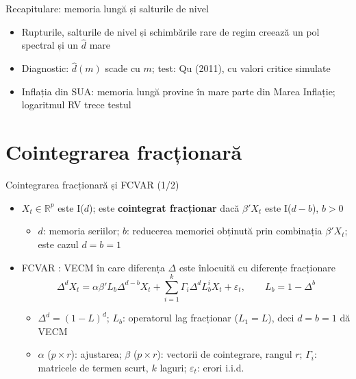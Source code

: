 \begin{frame}{Recapitulare: memoria lungă și salturile de nivel}
\itemsize{\small}
\begin{itemize}
    \item Rupturile, salturile de nivel și schimbările rare de regim creează un pol spectral și un $\hat d$ mare
    \item Diagnostic: $\hat d(m)$ scade cu $m$; test: Qu (2011), cu valori critice simulate
    \item Inflația din SUA: memoria lungă provine în mare parte din Marea Inflație; logaritmul RV trece testul
\end{itemize}
\end{frame}


\section{Cointegrarea fracționară}

\begin{frame}{Cointegrarea fracționară și FCVAR (1/2)}
\itemsize{\small}
\begin{itemize}
    \item $X_t \in \mathbb R^p$ este I($d$); este \textbf{cointegrat fracționar} dacă $\beta'X_t$ este I($d - b$), $b > 0$
    \begin{itemize}
        \item $d$: memoria seriilor; $b$: reducerea memoriei obținută prin combinația $\beta'X_t$;  este cazul $d = b = 1$
    \end{itemize}
    \item FCVAR : VECM în care diferența $\Delta$ este înlocuită cu diferențe fracționare
    \[ \Delta^dX_t = \alpha\beta'L_b\Delta^{d-b}X_t + \sum_{i=1}^k\Gamma_i\Delta^dL_b^iX_t + \varepsilon_t, \qquad L_b = 1 - \Delta^b \]
    \begin{itemize}
        \item $\Delta^d = (1 - L)^d$; $L_b$: operatorul lag fracționar ($L_1 = L$), deci $d = b = 1$ dă VECM
        \item $\alpha$ ($p \times r$): ajustarea; $\beta$ ($p \times r$): vectorii de cointegrare, rangul $r$; $\Gamma_i$: matricele de termen scurt, $k$ laguri; $\varepsilon_t$: erori i.i.d.
    \end{itemize}
\end{itemize}
\end{frame}

